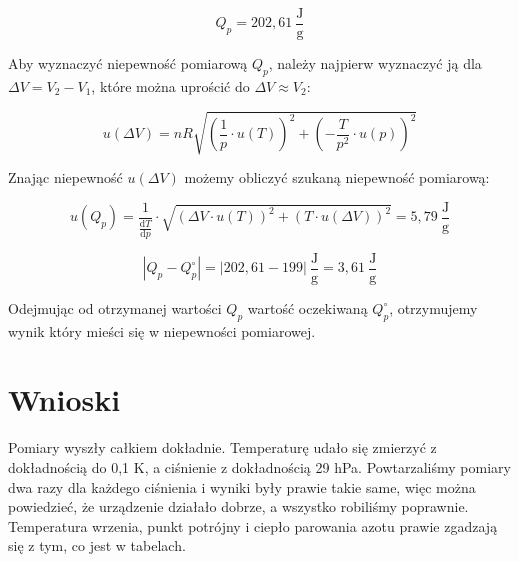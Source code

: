\documentclass{fizykalab}
\begin{document}
\begin{equation}
Q_p = 202,61~\frac{\text{J}}{\text{g}}
\end{equation}

Aby wyznaczyć niepewność pomiarową $Q_p$, należy najpierw wyznaczyć ją dla $\Delta V = V_2 - V_1$, które można uprościć do $\Delta V \approx V_2$:

\begin{equation}
u(\Delta V) = nR\sqrt{\left(\frac{1}{p} \cdot u(T)\right)^2 + \left(-\frac{T}{p^2} \cdot u(p)\right)^2}
\end{equation}

Znając niepewność $u(\Delta V)$ możemy obliczyć szukaną niepewność pomiarową:

\begin{equation}
u(Q_p) = \frac{1}{\frac{\mathrm{d}T}{\mathrm{d}p}} \cdot \sqrt{(\Delta V \cdot u(T))^2 + (T \cdot u(\Delta V))^2} = 5,79~\frac{\text{J}}{\text{g}}
\end{equation}

\begin{equation}
|Q_p - Q_p^{\circ}| = |202,61 - 199|~\frac{\text{J}}{\text{g}} = 3,61~\frac{\text{J}}{\text{g}}
\end{equation}

Odejmując od otrzymanej wartości $Q_p$ wartość oczekiwaną $Q_p^{\circ}$, otrzymujemy wynik który mieści się w niepewności pomiarowej.

\section{Wnioski}
Pomiary wyszły całkiem dokładnie. Temperaturę udało się zmierzyć z dokładnością do 0,1 K, a ciśnienie z dokładnością 29 hPa. Powtarzaliśmy pomiary dwa razy dla każdego ciśnienia i wyniki były prawie takie same, więc można powiedzieć, że urządzenie działało dobrze, a wszystko robiliśmy poprawnie.
Temperatura wrzenia, punkt potrójny i ciepło parowania azotu prawie zgadzają się z tym, co jest w tabelach.
\end{document}
